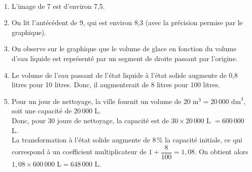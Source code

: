 \ \\ [-5mm]
\begin{enumerate}
   \item L'image de 7 est d'environ 7,5. 
   \item On lit l'antécédent de 9, qui est environ 8,3 (avec la précision permise par le graphique). \\
   \item On observe sur le graphique que le volume de glace en fonction du volume d'eau liquide est représenté par un segment de droite passant par l'origine. 
   \item Le volume de l'eau passant de l'état liquide à l'état solide augmente de 0,8 litres pour 10 litres. Donc, il augmenterait de 8 litres pour 100 litres. 
   \item Pour un jour de nettoyage, la ville fournit un volume de $20 \text{ m}^3 = 20\,000 \text{ dm}^3$, soit une capacité de $20\,000$ L. \\
   Donc, pour 30 jours de nettoyage, la capacité est de $30\times 20\,000$ L $=600\,000$ L. \\
   La transformation à l'état solide augmente de 8\,\% la capacité initiale, ce qui correspond à un coefficient multiplicateur de $1+\dfrac{8}{100} =1,08$. On obtient alors $1,08\times600\,000 \text{ L} = 648\,000 \text{ L}$. \\ [1mm]
\end{enumerate}
